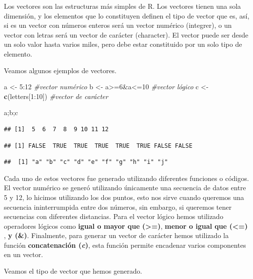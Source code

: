 \documentclass[]{article}
\newenvironment{Shaded}{\begin{snugshade}}{\end{snugshade}}
\newcommand{\KeywordTok}[1]{\textcolor[rgb]{0.13,0.29,0.53}{\textbf{{#1}}}}
\newcommand{\DecValTok}[1]{\textcolor[rgb]{0.00,0.00,0.81}{{#1}}}
\newcommand{\StringTok}[1]{\textcolor[rgb]{0.31,0.60,0.02}{{#1}}}
\newcommand{\CommentTok}[1]{\textcolor[rgb]{0.56,0.35,0.01}{\textit{{#1}}}}
\newcommand{\NormalTok}[1]{{#1}}
\begin{document}
Los vectores son las estructuras más simples de R. Los vectores tienen
una sola dimensión, y los elementos que lo constituyen definen el tipo
de vector que es, así, si es un vector con números enteros será un
vector numérico (integrer), o un vector con letras será un vector de
carácter (character). El vector puede ser desde un solo valor hasta
varios miles, pero debe estar constituido por un solo tipo de elemento.

Veamos algunos ejemplos de vectores.

\begin{Shaded}
\begin{Highlighting}[]
\NormalTok{a <-}\StringTok{ }\DecValTok{5}\NormalTok{:}\DecValTok{12} \CommentTok{#vector numérico}
\NormalTok{b <-}\StringTok{ }\NormalTok{a>=}\DecValTok{6}\NormalTok{&a<=}\DecValTok{10} \CommentTok{#vector lógico}
\NormalTok{c <-}\StringTok{ }\KeywordTok{c}\NormalTok{(letters[}\DecValTok{1}\NormalTok{:}\DecValTok{10}\NormalTok{]) }\CommentTok{#vector de carácter}

\NormalTok{a;b;c}
\end{Highlighting}
\end{Shaded}

\begin{verbatim}
## [1]  5  6  7  8  9 10 11 12
\end{verbatim}

\begin{verbatim}
## [1] FALSE  TRUE  TRUE  TRUE  TRUE  TRUE FALSE FALSE
\end{verbatim}

\begin{verbatim}
##  [1] "a" "b" "c" "d" "e" "f" "g" "h" "i" "j"
\end{verbatim}

Cada uno de estos vectores fue generado utilizando diferentes funciones
o códigos. El vector numérico se generó utilizando únicamente una
secuencia de datos entre 5 y 12, lo hicimos utilizando los dos puntos,
esto nos sirve cuando queremos una secuencia ininterrumpida entre dos
números, sin embargo, si queremos tener secuencias con diferentes
distancias. Para el vector lógico hemos utilizado operadores lógicos
como \textbf{igual o mayor que (\textgreater{}=)}, \textbf{menor o igual
que (\textless{}=)} , \textbf{y (\&)}. Finalmente, para generar un
vector de carácter hemos utilizado la función \textbf{concatenación
(\emph{c})}, esta función permite encadenar varios componentes en un
vector.

Veamos el tipo de vector que hemos generado.
\end{document}
